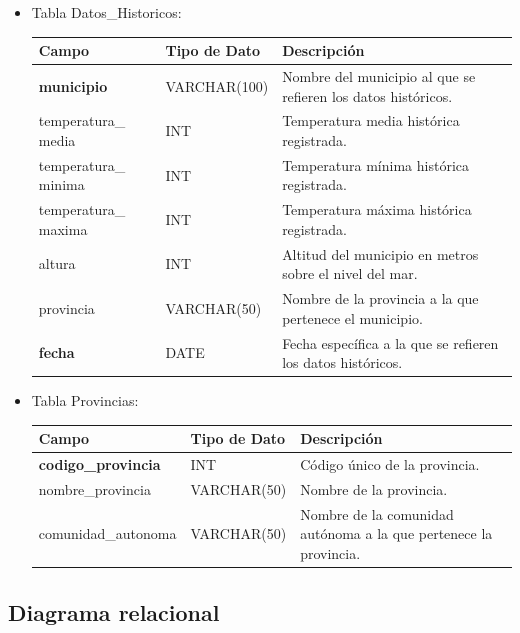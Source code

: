 \documentclass[12pt, a4paper]{article}
\begin{document}
\begin{itemize}
\newpage
\item Tabla Datos\_Historicos:

\begin{center}
\begin{tabular}{|p{}|p{}|p{}|}
    \hline
    \textbf{Campo} & \textbf{Tipo de Dato} & \textbf{Descripción} \\
    \hline
    \textbf{municipio} & VARCHAR(100) & Nombre del municipio al que se refieren los datos históricos. \\
    temperatura\_ media & INT & Temperatura media histórica registrada. \\
    temperatura\_ minima & INT & Temperatura mínima histórica registrada. \\
    temperatura\_ maxima & INT & Temperatura máxima histórica registrada. \\
    altura & INT & Altitud del municipio en metros sobre el nivel del mar. \\
    provincia & VARCHAR(50) & Nombre de la provincia a la que pertenece el municipio. \\
    \textbf{fecha} & DATE & Fecha específica a la que se refieren los datos históricos. \\
    \hline
\end{tabular}
\end{center}

\item Tabla Provincias: 
\begin{center}
\begin{tabular}{|p{}|p{}|p{}|}
    \hline
    \textbf{Campo} & \textbf{Tipo de Dato} & \textbf{Descripción} \\
    \hline
    \textbf{codigo\_provincia} & INT & Código único de la provincia. \\
    nombre\_provincia & VARCHAR(50) & Nombre de la provincia. \\
    comunidad\_autonoma & VARCHAR(50) & Nombre de la comunidad autónoma a la que pertenece la provincia. \\
    \hline
\end{tabular}
\end{center}

\end{itemize}

\subsection{Diagrama relacional}
\end{document}
